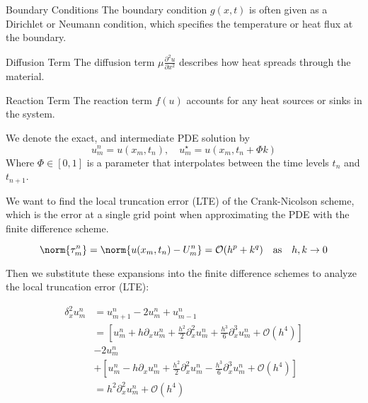 \begin{remark}{Boundary Conditions}{}
    The boundary condition $g(x, t)$ is often given as a Dirichlet or Neumann condition, which specifies the temperature or heat flux at the boundary.
\end{remark}

\begin{remark}{Diffusion Term}{}
    The diffusion term $\mu \frac{\partial^2 u}{\partial x^2}$ describes how heat spreads through the material.
\end{remark}

\begin{remark}{Reaction Term}{}
    The reaction term $f(u)$ accounts for any heat sources or sinks in the system.
\end{remark}





We denote the exact, and intermediate PDE solution by
\[
  u_m^n = u(x_m, t_n), \quad u_m^\star = u(x_m, t_n + \Phi k)
\]
Where \(\Phi \in [0, 1]\) is a parameter that interpolates between the time levels \(t_n\) and \(t_{n+1}\).

We want to find the local truncation error (LTE) of the Crank-Nicolson scheme, which is the error at a single grid point when approximating the PDE with the finite difference scheme.

\[
  \norm{\tau_m^n} = \norm{u(x_m, t_n) - U_m^n} = \mathcal{O}(h^p + k^q) \quad \text{as} \quad h, k \to 0
\]

Then we substitute these expansions into the finite difference schemes to analyze the local truncation error (LTE):

\begin{align*}
  \delta_x^2 u_m^n & = u_{m+1}^n - 2 u_m^n + u_{m-1}^n                                                                                                    \\
                   & = \left[ u_m^n + h \partial_x u_m^n + \frac{h^2}{2} \partial_x^2 u_m^n + \frac{h^3}{6} \partial_x^3 u_m^n + \mathcal{O}(h^4) \right] \\
                   & - 2 u_m^n                                                                                                                            \\
                   & + \left[ u_m^n - h \partial_x u_m^n + \frac{h^2}{2} \partial_x^2 u_m^n - \frac{h^3}{6} \partial_x^3 u_m^n + \mathcal{O}(h^4) \right] \\
                   & = h^2 \partial_x^2 u_m^n + \mathcal{O}(h^4)
\end{align*}

